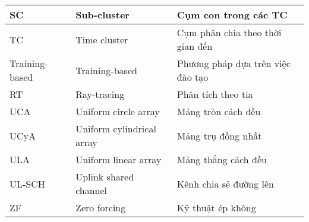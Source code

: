 {{\begin{longtable}{|p{2.35cm}|>{\raggedright}p{6.2cm}|p{5.75cm}|}
\hline
SC & Sub-cluster & Cụm con trong các TC \\
\hline
TC & Time cluster & Cụm phân chia theo thời gian đến \\
\hline
Training-based & Training-based & Phương pháp dựa trên việc đào tạo \\ 
\hline
RT  & Ray-tracing & Phân tích theo tia \\
\hline
UCA & Uniform circle array & Mảng tròn cách đều \\ 
\hline
UCyA & Uniform cylindrical array & Mảng trụ đồng nhất \\ 
\hline
ULA & Uniform linear array & Mảng thẳng cách đều \\ 
\hline
UL-SCH & Uplink shared channel & Kênh chia sẻ đường lên \\ 
\hline
ZF & Zero forcing & Kỹ thuật ép không \\
\hline
\end{longtable}
}
}
			